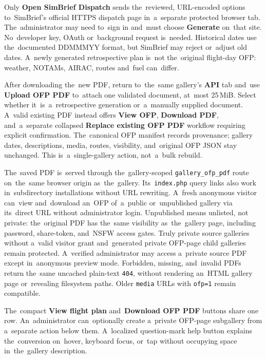 \documentclass[11pt,a4paper]{article}
\newcommand{\ui}[1]{\textbf{#1}}
\newcommand{\codeword}[1]{\nolinkurl{#1}}
\begin{document}
Only \ui{Open SimBrief Dispatch} sends the~reviewed, URL-encoded options
to~SimBrief's official HTTPS dispatch page in~a~separate protected browser tab.
The~administrator may need to~sign in and~must choose \ui{Generate} on~that
site. No~developer key, OAuth or~background request is~needed. Historical dates
use the~documented DDMMMYY format, but SimBrief may reject or~adjust old dates.
A~newly generated retrospective plan is~not the~original flight-day OFP:
weather, NOTAMs, AIRAC, routes and~fuel can~differ.

After downloading the~new PDF, return to~the~same gallery's \ui{API} tab and~use
\ui{Upload OFP PDF} to~attach one validated document, at~most 25\,MiB. Select
whether it~is~a~retrospective generation or~a~manually supplied document.
A~valid existing PDF instead offers \ui{View OFP}, \ui{Download PDF},
and~a~separate collapsed \ui{Replace existing OFP PDF} workflow requiring
explicit confirmation. The~canonical OFP manifest records provenance; gallery
dates, descriptions, media, routes, visibility, and~original OFP JSON stay
unchanged. This is~a~single-gallery action, not~a~bulk rebuild.

The~saved PDF is~served through the~gallery-scoped \codeword{gallery\_ofp\_pdf}
route on~the~same browser origin as~the~gallery. Its~\codeword{index.php} query
links also work in~subdirectory installations without URL rewriting. A~fresh
anonymous visitor can~view and~download an~OFP of~a~public or~unpublished
gallery via its~direct URL without administrator login. Unpublished means
unlisted, not private: the~original PDF has the~same visibility as~the~gallery
page, including password, share-token, and~NSFW access gates. Truly private
source galleries without a~valid visitor grant and~generated private OFP-page
child galleries remain protected. A~verified administrator may access a~private
source PDF except in~anonymous preview mode. Forbidden, missing, and~invalid
PDFs return the~same uncached plain-text \codeword{404}, without rendering
an~HTML gallery page or~revealing filesystem paths. Older \codeword{media} URLs
with \codeword{ofp=1} remain compatible.

The~compact \ui{View flight plan} and~\ui{Download OFP PDF} buttons share one
row. An~administrator can~optionally create a~private OFP-page subgallery from
a~separate action below them. A~localized question-mark help button explains
the~conversion on~hover, keyboard focus, or~tap without occupying space
in~the~gallery description.
\end{document}
